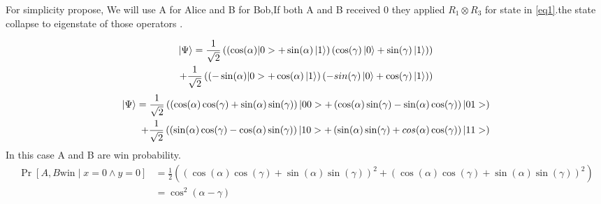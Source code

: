 For simplicity propose,  We will use A for Alice and B for Bob,If both A and B  received $0$ they applied $R_1\otimes R_3$ for  state in \ref{eq1}.the state collapse to eigenstate of those operators .



\begin{equation*}
\begin{aligned}
\ket{\Psi }= \frac{1}{\sqrt{2}}\left( \left(\cos(\alpha)|0>+\sin(\alpha)\ket{1} \right) \left(\cos(\gamma)\ket{0}+\sin(\gamma)\ket{1} \right) \right)  \\  
+  \frac{1}{\sqrt{2}} \left( \left(-\sin(\alpha)|0>+\cos(\alpha)\ket{1} \right) \left(-sin(\gamma)\ket{0}+\cos(\gamma)\ket{1} \right) \right)
\end{aligned}
\end{equation*}
\begin{equation*}
\begin{aligned}
\ket{\Psi} = \frac{1}{\sqrt{2}}\left(\left(\cos(\alpha) \cos(\gamma)+\sin(\alpha) \sin(\gamma)\right)|00>+\left( \cos(\alpha)  \sin(\gamma)-\sin(\alpha)  \cos(\gamma)\right)|01>\right)\\
+\frac{1}{\sqrt{2}}\left( \left( \sin(\alpha)  \cos(\gamma)-\cos(\alpha) \sin(\gamma)\right)|10>+\left(\sin(\alpha)  \sin(\gamma)+cos(\alpha)  \cos(\gamma)\right)|11>\right)
\end{aligned}
\end{equation*}
In this case A and B are win probability.
\begin{align}
 \Pr[A,B \text{win}  \mid  x=0 \wedge y=0]&=\frac{1}{2}\left(\left(\cos(\alpha) \cos(\gamma)+\sin(\alpha)\sin(\gamma)\right)^2   +\left(\cos(\alpha) \cos(\gamma)+\sin(\alpha)\sin(\gamma)\right)^2  \right)\nonumber\\ 
&=\cos^2(\alpha-\gamma)\label{eq2}
\end{align}

